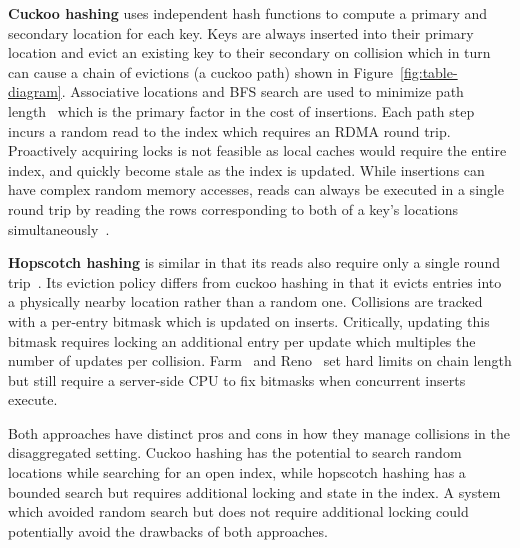 \textbf{Cuckoo hashing} uses independent hash functions to compute a primary and secondary location
for each key. Keys are always inserted into their primary location and evict an existing key to
their secondary on collision which in turn can cause a chain of evictions (a cuckoo path) shown in
Figure~\ref{fig:table-diagram}. Associative locations and BFS search are used to minimize path
length~\cite{memc3,cuckoo-improvements} which is the primary factor in the cost of insertions.  Each
path step incurs a random read to the index which requires an RDMA round trip. Proactively acquiring
locks is not feasible as local caches would require the entire index, and quickly become stale as
the index is updated.
While insertions can have complex random memory accesses, reads can always be executed in a single
round trip by reading the rows corresponding to both of a key's locations
simultaneously~\cite{memc3,cuckoo-improvements,pilaf}.

\textbf{Hopscotch hashing} is similar in that its reads also require only a single round
trip~\cite{hopscotch,farm}. Its eviction policy differs from cuckoo hashing in that it evicts
entries into a physically nearby location rather than a random one. Collisions are tracked with a
per-entry bitmask which is updated on inserts. Critically, updating this bitmask requires locking an
additional entry per update which multiples the number of updates per collision. Farm~\cite{farm}
and Reno~\cite{reno} set hard limits on chain length but still require a server-side CPU to fix
bitmasks when concurrent inserts execute.

Both approaches have distinct pros and cons in how they manage collisions in the disaggregated
setting. Cuckoo hashing has the potential to search random locations while searching for an open
index, while hopscotch hashing has a bounded search but requires additional locking and state in the
index. A system which avoided random search but does not require additional locking could
potentially avoid the drawbacks of both approaches.

